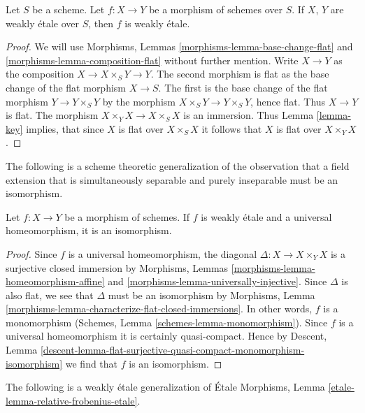 \begin{lemma}
\label{lemma-weakly-etale-permanence}
Let $S$ be a scheme. Let $f : X \to Y$ be a morphism of schemes over $S$.
If $X$, $Y$ are weakly \'etale over $S$, then $f$ is weakly \'etale.
\end{lemma}

\begin{proof}
We will use Morphisms, Lemmas \ref{morphisms-lemma-base-change-flat} and
\ref{morphisms-lemma-composition-flat} without further mention.
Write $X \to Y$ as the composition $X \to X \times_S Y \to Y$.
The second morphism is flat as the base change of the flat morphism
$X \to S$. The first is the base change of the flat morphism
$Y \to Y \times_S Y$ by the morphism $X \times_S Y \to Y \times_S Y$,
hence flat. Thus $X \to Y$ is flat. The morphism
$X \times_Y X \to X \times_S X$ is an immersion.
Thus Lemma \ref{lemma-key} implies, that since
$X$ is flat over $X \times_S X$ it follows that $X$ is
flat over $X \times_Y X$.
\end{proof}

\noindent
The following is a scheme theoretic generalization of the observation
that a field extension that is simultaneously separable and purely inseparable
must be an isomorphism. 

\begin{lemma}
\label{lemma-weakly-etale-universal-homeomorphism}
Let $f : X \to Y$ be a morphism of schemes. If $f$ is weakly \'etale and
a universal homeomorphism, it is an isomorphism. 
\end{lemma}

\begin{proof}
Since $f$ is a universal homeomorphism, the diagonal
$\Delta : X \to X \times_Y X$ is a surjective closed immersion by
Morphisms, Lemmas \ref{morphisms-lemma-homeomorphism-affine} and
\ref{morphisms-lemma-universally-injective}. Since $\Delta$ is also
flat, we see that $\Delta$ must be an isomorphism by
Morphisms, Lemma \ref{morphisms-lemma-characterize-flat-closed-immersions}.
In other words, $f$ is a monomorphism
(Schemes, Lemma \ref{schemes-lemma-monomorphism}).
Since $f$ is a universal homeomorphism it is certainly
quasi-compact. Hence by Descent, Lemma
\ref{descent-lemma-flat-surjective-quasi-compact-monomorphism-isomorphism}
we find that $f$ is an isomorphism.
\end{proof}

\noindent
The following is a weakly \'etale generalization of
\'Etale Morphisms, Lemma \ref{etale-lemma-relative-frobenius-etale}.

